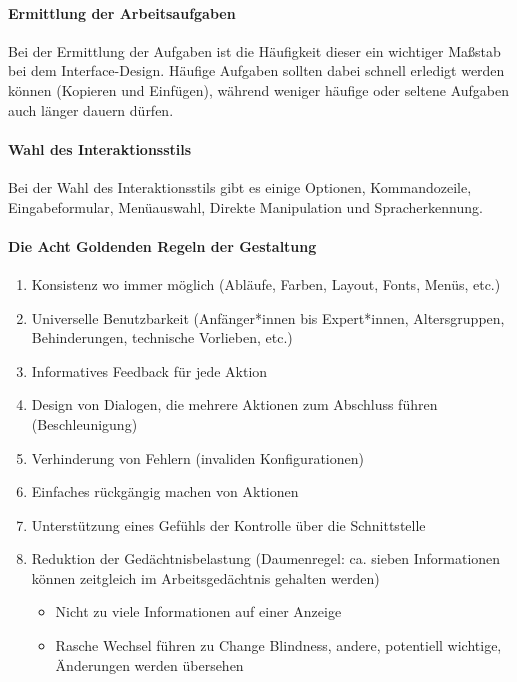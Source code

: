 				\paragraph{Ermittlung der Arbeitsaufgaben}
					Bei der Ermittlung der Aufgaben ist die Häufigkeit dieser ein wichtiger Maßstab bei dem Interface-Design. Häufige Aufgaben sollten dabei schnell erledigt werden können (\zB Kopieren und Einfügen), während weniger häufige oder seltene Aufgaben auch länger dauern dürfen.

				\paragraph{Wahl des Interaktionsstils}
					Bei der Wahl des Interaktionsstils gibt es einige Optionen, \zB Kommandozeile, Eingabeformular, Menüauswahl, Direkte Manipulation und Spracherkennung.

				\paragraph{Die Acht Goldenden Regeln der Gestaltung}
					\begin{enumerate}
						\item Konsistenz wo immer möglich (Abläufe, Farben, Layout, Fonts, Menüs, etc.)
						\item Universelle Benutzbarkeit (Anfänger*innen bis Expert*innen, Altersgruppen, Behinderungen, technische Vorlieben, etc.)
						\item Informatives Feedback für jede Aktion
						\item Design von Dialogen, die mehrere Aktionen zum Abschluss führen (Beschleunigung)
						\item Verhinderung von Fehlern (\zB invaliden Konfigurationen)
						\item Einfaches rückgängig machen von Aktionen
						\item Unterstützung eines Gefühls der Kontrolle über die Schnittstelle
						\item Reduktion der Gedächtnisbelastung (Daumenregel: ca. sieben Informationen können zeitgleich im Arbeitsgedächtnis gehalten werden)
							\begin{itemize}
								\item Nicht zu viele Informationen auf einer Anzeige
								\item Rasche Wechsel führen zu Change Blindness, \dh andere, potentiell wichtige, Änderungen werden übersehen
							\end{itemize}
					\end{enumerate}

